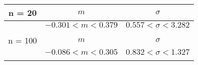 \begin{tabular}{| c | c | c |} \\ \hline 
n = 20 & $m$ & $\sigma$ \\ \hline 
 & $-0.301 < m < 0.379$ & $0.557 < \sigma < 3.282$ \\ \hline 
 & & \\ \hline 
n = 100 & $m$ & $\sigma$ \\ \hline 
 & $-0.086 < m < 0.305$ & $0.832 < \sigma < 1.327$ \\ \hline 
 & & \\ \hline 
 \end{tabular} 

